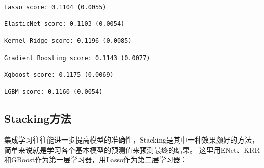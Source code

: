 \documentclass[11pt]{article}
\begin{document}
    \begin{Verbatim}[commandchars=\\\{\}]

Lasso score: 0.1104 (0.0055)

ElasticNet score: 0.1103 (0.0054)

Kernel Ridge score: 0.1196 (0.0085)

Gradient Boosting score: 0.1143 (0.0077)

Xgboost score: 0.1175 (0.0069)

LGBM score: 0.1160 (0.0054)

    \end{Verbatim}

    \hypertarget{stackingux65b9ux6cd5}{%
\subsection{Stacking方法}\label{stackingux65b9ux6cd5}}

集成学习往往能进一步提高模型的准确性，Stacking是其中一种效果颇好的方法，简单来说就是学习各个基本模型的预测值来预测最终的结果。
这里用ENet、KRR和GBoost作为第一层学习器，用Lasso作为第二层学习器：
\end{document}
